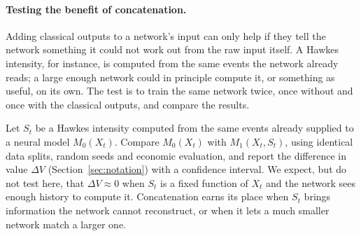 \paragraph{Testing the benefit of concatenation.} Adding classical outputs to a network's input can only
help if they tell the network something it could not work out from the raw input itself. A Hawkes intensity,
for instance, is computed from the same events the network already reads; a large enough network could in
principle compute it, or something as useful, on its own. The test is to train the same network twice, once
without and once with the classical outputs, and compare the results.
\begin{example}
\label{ex:right-ablation}
Let $S_t$ be a Hawkes intensity computed from the same events already supplied to a neural model $M_0(X_t)$.
Compare $M_0(X_t)$ with $M_1(X_t, S_t)$, using identical data splits, random seeds and economic evaluation, and
report the difference in value $\Delta V$ (Section~\ref{sec:notation}) with a confidence interval. We expect,
but do not test here, that $\Delta V \approx 0$ when $S_t$ is a fixed function of $X_t$ and the network sees
enough history to compute it. Concatenation earns its place when $S_t$ brings information the network cannot
reconstruct, or when it lets a much smaller network match a larger one.
\end{example}



